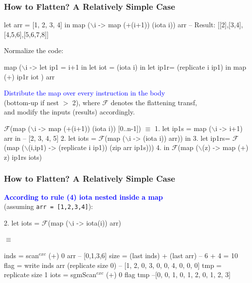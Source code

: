 \documentclass{beamer}
\newcommand{\blue}[1]{\textcolor{Blue}{{#1}}}
\renewcommand{\emph}[1]{\textcolor{structure}{#1}}
\newcommand{\emp}[1]{\textcolor{DikuRed}{ #1}}
\newcommand{\mymath}[1]{$ #1 $}
\newcommand{\myindu}[1]{^{#1}}
\begin{document}
\begin{frame}[fragile,t]
  \frametitle{How to Flatten? A Relatively Simple Case}
\begin{colorcode}
let arr = [1, 2, 3, 4] in
\alert{map (\mymath{\backslash}i -> map (+(i+1)) (iota i)) arr}
-- Result: [[2],[3,4],[4,5,6],[5,6,7,8]]
\end{colorcode}
\bigskip
\pause

Normalize the code:
\begin{colorcode}
map (\mymath{\backslash}i -> let ip1 = i+1 in
           let iot = (iota i) in
           let ip1r= (replicate i ip1) in
           map (+) ip1r iot            ) arr
\end{colorcode}
\bigskip

\blue{Distribute the map over every instruction in the body}\\
(bottom-up if nest $>$ 2), where $\mathcal{F}$ denotes the flattening transf,\\
and modify the inputs (results) accordingly.
\bigskip
\pause

\begin{colorcode}
\mymath{\mathcal{F}}(\alert{map (\mymath{\backslash}i -> map (+(i+1)) (iota i)) [0..n-1]}) \mymath{\equiv}
1. let ip1s = map (\mymath{\backslash}i -> i+1) arr in -- [2, 3, 4, 5]
2. let iots = \mymath{\mathcal{F}}(map (\mymath{\backslash}i -> (iota i)) arr)) in
3. let ip1rs= \mymath{\mathcal{F}}(map (\mymath{\backslash}(i,ip1) -> (replicate i ip1)) (zip arr ip1s)))
4. in  \mymath{\mathcal{F}}(map (\mymath{\backslash}(z) -> map (+) z) ip1rs iots)
\end{colorcode}

\end{frame}



\begin{frame}[fragile,t]
  \frametitle{How to Flatten? A Relatively Simple Case}

\blue{\bf According to rule (4) iota nested inside a map}\\
(assuming {\tt arr = [1,2,3,4]}):
\bigskip

\begin{colorcode}
2. let iots = \mymath{\mathcal{F}}(map (\mymath{\backslash}i -> iota(i)) arr)

\mymath{\equiv}

inds = scan\mymath{\myindu{exc}} (+) 0 arr -- [0,1,3,6]
size = (last inds) + (last arr) -- 6 + 4 = 10
flag = write inds arr 
             (replicate size 0)
--           [1, 2, 0, 3, 0, 0, 4, 0, 0, 0]
tmp  = replicate size 1
iots = sgmScan\mymath{\myindu{exc}} (+) 0 flag \emp{tmp} \emph{--[0, 0, 1, 0, 1, 2, 0, 1, 2, 3]}
\end{colorcode}

\end{frame}
\end{document}
